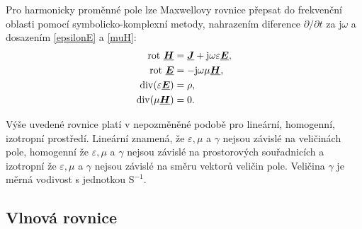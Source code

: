 \documentclass[12pt,a4paper,oneside]{article}
\numberwithin{equation}{section} %
\numberwithin{figure}{section} %
\numberwithin{table}{section} %
\newcommand{\mj}{\mathrm{j}} %
\renewcommand{\vec}[1]{\mbox{\boldmath$#1$}} %
\newcommand{\faz}[1]{{\underline{#1}}} %
\newcommand{\rot}{\mathrm{rot}\ }
\begin{document}
Pro harmonicky proměnné pole lze Maxwellovy rovnice přepsat do frekvenční oblasti pomocí symbolicko-komplexní metody, nahrazením diference $\partial / \partial t$ za $\mj \omega$ a dosazením \ref{epsilonE} a \ref{muH}:
\begin{subequations}
\begin{align}
\label{max1fharm}
\rot \faz{\vec{H}} &= \faz{\vec{J}} + \mj \omega \varepsilon \faz{\vec{E}},
\\
\label{max2fharm}
\rot \faz{\vec{E}} &= - \mj \omega \mu \faz{\vec{H}},
\\
\udiv (\varepsilon \faz{\vec{E}}) &= \rho,
\\
\udiv (\mu \faz{\vec{H}}) &= 0.
\end{align}
\end{subequations}

Výše uvedené rovnice platí v nepozměněné podobě pro lineární, homogenní, izotropní prostředí. Lineární znamená, že $\varepsilon , \mu$ a $\gamma$ nejsou závislé na veličinách pole, homogenní že $\varepsilon , \mu$ a $\gamma$ nejsou závislé na prostorových souřadnicích a izotropní že $\varepsilon , \mu$ a $\gamma$ nejsou závislé na směru vektorů veličin pole. Veličina $\gamma$ je měrná vodivost s jednotkou $\mathrm{S} ^{-1}$. \cite{Teorie}


\subsection{Vlnová rovnice}
\end{document}
